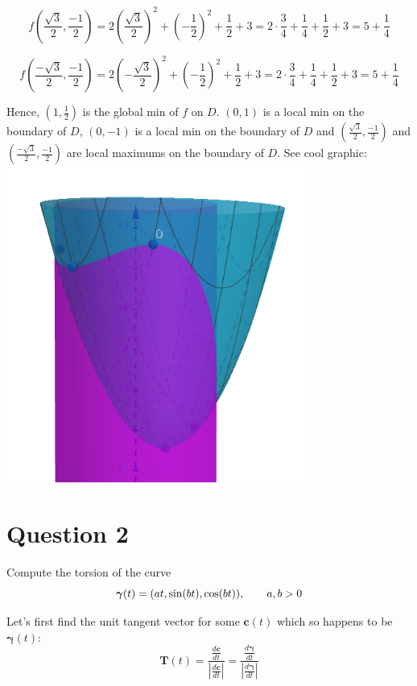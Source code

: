 \documentclass[12pt]{article}
\newcommand{\vect}[1]{\boldsymbol{#1}}
\begin{document}
$$
f\left( \frac{\sqrt{3}}{2}, \frac{-1}{2} \right)=2\left( \frac{\sqrt{3}}{ 2 } \right)^2+\left( -\frac{1}{2} \right)^2+\frac{1}{2}+3=2 \cdot \frac{3}{4} + \frac{1}{4} + \frac{1}{2} + 3 = 5 + \frac{1}{4}
$$

$$
f\left( \frac{-\sqrt{3}}{2}, \frac{-1}{2} \right)=2\left( -\frac{\sqrt{3}}{ 2 } \right)^2+\left( -\frac{1}{2} \right)^2+\frac{1}{2}+3=2 \cdot \frac{3}{4} + \frac{1}{4} + \frac{1}{2} + 3 = 5 + \frac{1}{4}
$$

Hence, $\left(1, \frac{1}{2} \right)$ is the global min of $f$ on $D$. $(0, 1)$ is a local min on the boundary of $D$, $(0, -1)$ is a local min on the boundary of $D$ and $\left( \frac{\sqrt{3}}{2}, \frac{-1}{2} \right)$ and $\left( \frac{-\sqrt{3}}{2}, \frac{-1}{2} \right)$ are local maximums on the boundary of $D$. See cool graphic:\\

\includegraphics[width=10cm]{image1}

\section*{Question 2}
Compute the torsion of the curve
$$
\vect{\gamma}(t)=(at, \sin(bt), \cos(bt)), \hspace{20px} a,b > 0
$$

Let's first find the unit tangent vector for some $\vect{c}(t)$ which so happens to be $\vect{\gamma}(t)$:\\

$$
\vect{T}(t)=\frac{\frac{d\vect{c}}{dt}}{|\frac{d\vect{c}}{dt}|}=\frac{\frac{d\vect{\gamma}}{dt}}{|\frac{d\vect{\gamma}}{dt}|}
$$
\end{document}
